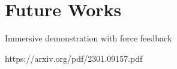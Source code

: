 \chapter{Future Works}

Immersive demonstration with force feedback 

https://arxiv.org/pdf/2301.09157.pdf

